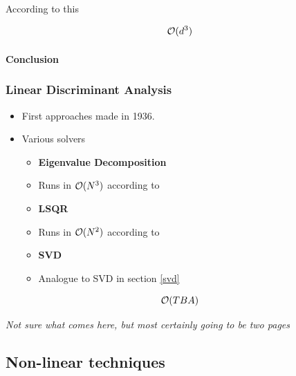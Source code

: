 According to this \cite{HandsOnMLCh8}

$$\mathcal{O}(d^3)$$


\clearpage

\paragraph{Conclusion}



\clearpage




\subsubsection{Linear Discriminant Analysis}

\begin{itemize}
	\item First approaches made in 1936. \cite{fisher1936use}
	\item Various solvers
	\begin{itemize}
		\item \textbf{Eigenvalue Decomposition}
		\item Runs in $\mathcal{O}(N^3)$ according to \cite{cai2008training}
	\end{itemize}
	\begin{itemize}
		\item \textbf{LSQR}
		\item Runs in $\mathcal{O}(N^2)$ according to \cite{di2013new}
	\end{itemize}
		\begin{itemize}
		\item \textbf{SVD}
		\item Analogue to SVD in section \ref{svd}
	\end{itemize}
\end{itemize}

$$\mathcal{O}(TBA)$$

\clearpage


\begin{center}
	\textit{Not sure what comes here, but most certainly going to be two pages}
\end{center}

\clearpage









\subsection{Non-linear techniques}


